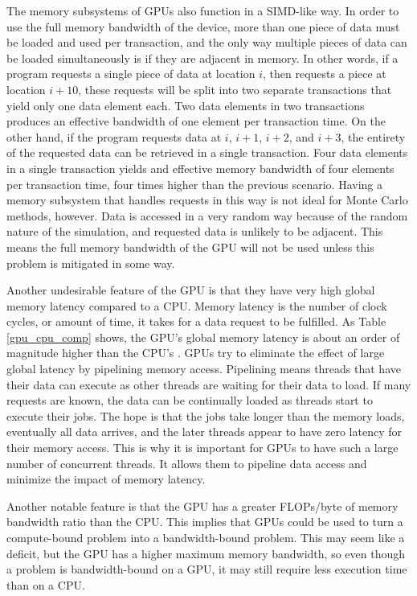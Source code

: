 The memory subsystems of GPUs also function in a SIMD-like way.  In order to use the full memory bandwidth of the device, more than one piece of data must be loaded and used per transaction, and the only way multiple pieces of data can be loaded simultaneously is if they are adjacent in memory.  In other words, if a program requests a single piece of data at location $i$, then requests a piece at location $i+10$, these requests will be split into two separate transactions that yield only one data element each.  Two data elements in two transactions produces an effective bandwidth of one element per transaction time.   On the other hand, if the program requests data at $i$, $i+1$, $i+2$, and $i+3$, the entirety of the requested data can be retrieved in a single transaction.  Four data elements in a single transaction yields and effective memory bandwidth of four elements per transaction time, four times higher than the previous scenario.  Having a memory subsystem that handles requests in this way is not ideal for Monte Carlo methods, however.  Data is accessed in a very random way because of the random nature of the simulation, and requested data is unlikely to be adjacent.  This means the full memory bandwidth of the GPU will not be used unless this problem is mitigated in some way.

Another undesirable feature of the GPU is that they have very high global memory latency compared to a CPU.  Memory latency is the number of clock cycles, or amount of time, it takes for a data request to be fulfilled.  As Table \ref{gpu_cpu_comp} shows, the GPU's global memory latency is about an order of magnitude higher than the CPU's \cite{cpu_latency,cuda}.  
GPUs try to eliminate the effect of large global latency by pipelining memory access.  Pipelining means threads that have their data can execute as other threads are waiting for their data to load.  If many requests are known, the data can be continually loaded as threads start to execute their jobs.  The hope is that the jobs take longer than the memory loads, eventually all data arrives, and the later threads appear to have zero latency for their memory access.  This is why it is important for GPUs to have such a large number of concurrent threads.  It allows them to pipeline data access and minimize the impact of memory latency.

Another notable feature is that the GPU has a greater FLOPs/byte of memory bandwidth ratio than the CPU.  This implies that GPUs could be used to turn a compute-bound problem into a bandwidth-bound problem.  This may seem like a deficit, but the GPU has a higher maximum memory bandwidth, so even though a problem is bandwidth-bound on a GPU, it may still require less execution time than on a CPU.


